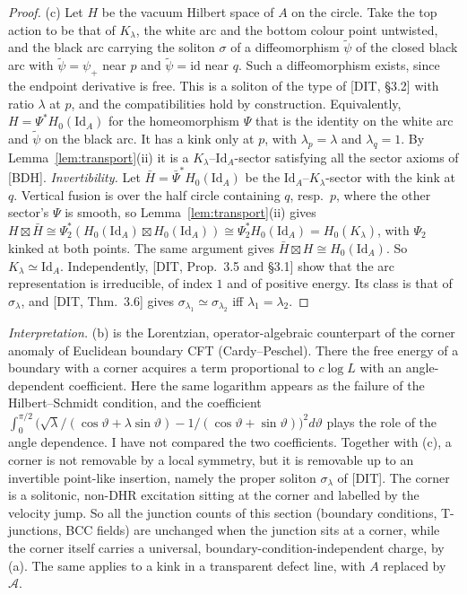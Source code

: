 \documentclass[11pt]{article}
\theoremstyle{definition}
\theoremstyle{remark}
\newcommand{\cA}{\mathcal A}
\newcommand{\fus}{\boxtimes}
\newcommand{\Id}{\mathrm{Id}}
\begin{document}
\begin{proof}
(c) Let $H$ be the vacuum Hilbert space of $A$ on the circle. Take the top action to be that of $K_\lambda$, the white arc and the bottom colour point untwisted, and the black arc carrying the soliton $\sigma$ of a diffeomorphism $\tilde\psi$ of the closed black arc with $\tilde\psi=\psi_+$ near $p$ and $\tilde\psi=\mathrm{id}$ near $q$. Such a diffeomorphism exists, since the endpoint derivative is free. This is a soliton of the type of [DIT, \S3.2] with ratio $\lambda$ at $p$, and the compatibilities hold by construction. Equivalently, $H=\Psi^*H_0(\Id_A)$ for the homeomorphism $\Psi$ that is the identity on the white arc and $\tilde\psi$ on the black arc. It has a kink only at $p$, with $\lambda_p=\lambda$ and $\lambda_q=1$. By Lemma~\ref{lem:transport}(ii) it is a $K_\lambda$--$\Id_A$-sector satisfying all the sector axioms of [BDH]. \emph{Invertibility.} Let $\bar H=\bar\Psi^*H_0(\Id_A)$ be the $\Id_A$--$K_\lambda$-sector with the kink at $q$. Vertical fusion is over the half circle containing $q$, resp.\ $p$, where the other sector's $\Psi$ is smooth, so Lemma~\ref{lem:transport}(ii) gives $H\fus\bar H\cong\Psi_2^*(H_0(\Id_A)\fus H_0(\Id_A))\cong\Psi_2^*H_0(\Id_A)=H_0(K_\lambda)$, with $\Psi_2$ kinked at both points. The same argument gives $\bar H\fus H\cong H_0(\Id_A)$. So $K_\lambda\simeq\Id_A$. Independently, [DIT, Prop.~3.5 and \S3.1] show that the arc representation is irreducible, of index $1$ and of positive energy. Its class is that of $\sigma_\lambda$, and [DIT, Thm.~3.6] gives $\sigma_{\lambda_1}\simeq\sigma_{\lambda_2}$ iff $\lambda_1=\lambda_2$.
\end{proof}

\emph{Interpretation.} (b) is the Lorentzian, operator-algebraic counterpart of the corner anomaly of Euclidean boundary CFT (Cardy--Peschel). There the free energy of a boundary with a corner acquires a term proportional to $c\log L$ with an angle-dependent coefficient. Here the same logarithm appears as the failure of the Hilbert--Schmidt condition, and the coefficient $\int_0^{\pi/2}\big(\sqrt\lambda/(\cos\vartheta+\lambda\sin\vartheta)-1/(\cos\vartheta+\sin\vartheta)\big)^2d\vartheta$ plays the role of the angle dependence. I have not compared the two coefficients. Together with (c), a corner is not removable by a local symmetry, but it is removable up to an invertible point-like insertion, namely the proper soliton $\sigma_\lambda$ of [DIT]. The corner is a solitonic, non-DHR excitation sitting at the corner and labelled by the velocity jump. So all the junction counts of this section (boundary conditions, T-junctions, BCC fields) are unchanged when the junction sits at a corner, while the corner itself carries a universal, boundary-condition-independent charge, by (a). The same applies to a kink in a transparent defect line, with $A$ replaced by $\cA$.
\end{document}

